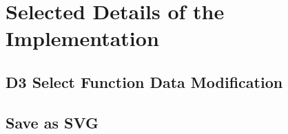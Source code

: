 \chapter{Selected Details of the Implementation}

\label{chap:SelectedDetails}


\section{D3 Select Function Data Modification}

\section{Save as SVG}